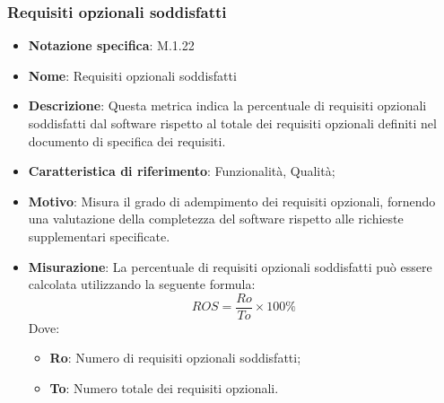 \subsubsection{Requisiti opzionali soddisfatti}
\begin{itemize}
    \item \textbf{Notazione specifica}: M.1.22
    \item \textbf{Nome}: Requisiti opzionali soddisfatti
    \item \textbf{Descrizione}: Questa metrica indica la percentuale di requisiti opzionali soddisfatti dal software rispetto al totale dei requisiti opzionali definiti nel documento di specifica dei requisiti.
    \item \textbf{Caratteristica di riferimento}: Funzionalità, Qualità;
    \item \textbf{Motivo}: Misura il grado di adempimento dei requisiti opzionali, fornendo una valutazione della completezza del software rispetto alle richieste supplementari specificate.
    \item \textbf{Misurazione}: La percentuale di requisiti opzionali soddisfatti può essere calcolata utilizzando la seguente formula:
    \[ ROS = \frac{Ro}{To} \times 100\% \]
    Dove:
    \begin{itemize}
        \item \textbf{Ro}: Numero di requisiti opzionali soddisfatti;
        \item \textbf{To}: Numero totale dei requisiti opzionali.
    \end{itemize}
\end{itemize}
